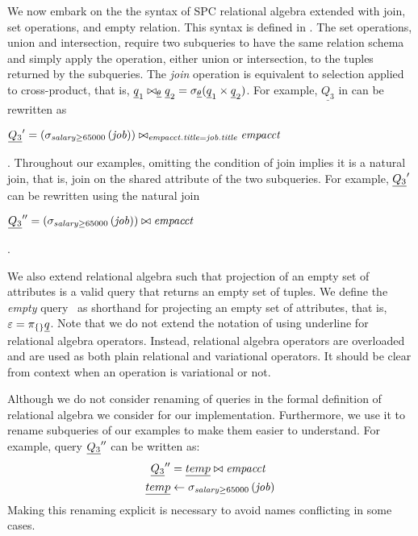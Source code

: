 We now embark on the the syntax of SPC relational algebra extended with 
join, set operations, and empty relation. This syntax is defined in .
%
The set operations, union and intersection, require two subqueries to have the same relation schema
and simply apply the operation, either union or intersection, to the tuples returned by
the subqueries.
%
The \emph{join} operation is equivalent to selection applied to cross-product, that is,
$\pQ_1 \bowtie_{\pCond} \pQ_2 = \vSel [\pCond] {(\pQ_1 \times \pQ_2)}$.
For example, $\underline{Q_3}$ in  can be rewritten as\\
\centerline{
\ensuremath{
\VVal {\underline{Q_3}} = \left(\sigma_{\salary \ge 65000} \left(\job\right)\right) \bowtie_{\empacct.\titleatt=\job.\titleatt} \empacct
}}.
\noindent
Throughout our examples, omitting the condition of join  implies it is a natural join,
that is, join on the shared attribute of the two subqueries.
For example, $\underline{Q_3}'$ can be rewritten using the natural join\\
\centerline{
\ensuremath{
\VVVal {\underline{Q_3}} =  \left(\sigma_{\salary \ge 65000} \left(\job\right)\right) \bowtie \empacct
}}.



We also extend relational algebra such that projection of an empty set of
attributes is a valid query that returns an empty set of tuples. We define the
\emph{empty} query \empPRel\ as shorthand for projecting an empty set of
attributes, that is, $\empPRel = \pi_{\{\}} \pQ$.
%
Note that we do not extend the notation of using underline for relational algebra
operators. Instead, relational algebra operators are overloaded and are used
as both plain relational and variational operators. It should be clear from
context when an operation is variational or not. 


Although we do not consider renaming of queries in the formal definition of 
relational algebra we consider for our implementation. Furthermore, we use it
to rename subqueries of our examples to make them easier to understand. 
For example, query $\underline{Q_3}''$ can be written as:
\begin{align*}
\VVVal {\underline{Q_3}} &= \underline{temp} \bowtie \empacct\\
\underline{temp} &\leftarrow  \sigma_{\salary \ge 65000} \left(\job\right)
\end{align*}
\noindent
Making this renaming explicit is necessary to avoid names conflicting in some cases.





